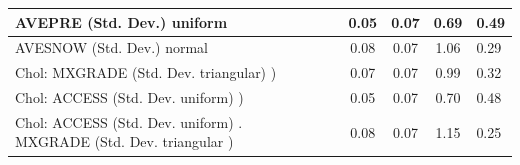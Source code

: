 \begin{table}
\begin{center}
\begin{tabular}{|l|l|c|c|c|l|}
			\hline
			AVEPRE (Std. Dev.) uniform &  & 0.05 & 0.07 & 0.69 & 0.49 \\
			\hline
			AVESNOW (Std. Dev.) normal &  & 0.08 & 0.07 & 1.06 & 0.29 \\
			\hline
			 Chol: MXGRADE (Std. Dev. triangular) ) &  & 0.07 & 0.07 & 0.99 & 0.32 \\
			\hline
			 Chol: ACCESS (Std. Dev. uniform) ) &  & 0.05 & 0.07 & 0.70 & 0.48 \\
			\hline
			 Chol: ACCESS (Std. Dev. uniform) . MXGRADE (Std. Dev.   triangular ) &  & 0.08 & 0.07 & 1.15 & 0.25 \\
			\hline
		\end{tabular}
	\end{center}
\end{table}